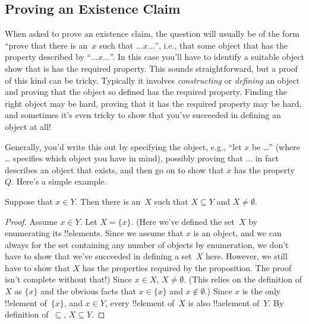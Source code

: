 \documentclass[../../../include/open-logic-section]{subfiles}
\begin{document}
\subsection{Proving an Existence Claim}

When asked to prove an existence claim, the question will usually be
of the form ``prove that there is an~$x$ such that $\dots x \dots$'',
i.e., that some object that has the property described by ``$\dots x
\dots$''. In this case you'll have to identify a suitable object show
that is has the required property.  This sounds straightforward, but a
proof of this kind can be tricky. Typically it involves
\emph{constructing} or \emph{defining} an object and proving that the
object so defined has the required property. Finding the right object
may be hard, proving that it has the required property may be hard,
and sometimes it's even tricky to show that you've succeeded in
defining an object at all!{}

Generally, you'd write this out by specifying the object, e.g., ``let
$x$ be \dots'' (where \dots{} specifies which object you have in
mind), possibly proving that $\dots$ in fact describes an object that
exists, and then go on to show that $x$ has the property~$Q$. Here's a
simple example.

\begin{prop}
  Suppose that $x \in Y$. Then there is an~$X$ such that $X \subseteq
  Y$ and $X \neq \emptyset$.
\end{prop}

\begin{proof}
  Assume $x \in Y$. Let $X = \{x\}$. (Here we've defined the set~$X$
  by enumerating its !!{element}s. Since we assume that $x$ is an
  object, and we can always for the set containing any number of
  objects by enumeration, we don't have to show that we've succeeded
  in defining a set~$X$ here.  However, we still have to show that $X$
  has the properties required by the proposition. The proof isn't
  complete without that!) Since $x \in X$, $X \neq \emptyset$. (This
  relies on the definition of $X$ as $\{x\}$ and the obvious facts
  that $x \in \{x\}$ and $x \notin \emptyset$.) Since $x$ is the only
  !!{element} of~$\{x\}$, and $x \in Y$, every !!{element} of~$X$ is
  also !!a{element} of~$Y$. By definition of~$\subseteq$, $X \subseteq
  Y$.
\end{proof}
\end{document}
